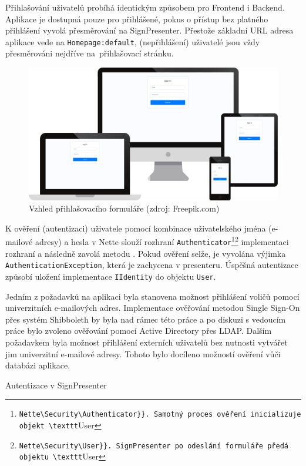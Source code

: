 Přihlašování uživatelů probíhá identickým způsobem pro Frontend i Backend. Aplikace je dostupná pouze pro přihlášené, pokus o přístup bez platného přihlášení vyvolá přesměrování na SignPresenter. Přestože základní URL adresa aplikace vede na \texttt{Homepage:default}, (nepřihlášení) uživatelé jsou vždy přesměrováni nejdříve na~přihlašovací stránku.

\begin{figure}[h]
	\centering
	\includegraphics[width=\linewidth]{svg/mockup/prihlasovani.eps}
	\captionsetup{width=\linewidth}
	\caption[Vzhled přihlašovacího formuláře]{Vzhled přihlašovacího formuláře (zdroj: Freepik.com)}
	\label{mockup:login}
\end{figure}

K ověření (autentizaci) uživatele pomocí kombinace uživatelského jména (e-mailové adresy) a hesla v Nette slouží rozhraní \texttt{Authenticator}\footnote{\Verb{Nette\Security\Authenticator}}. Samotný proces ověření inicializuje objekt \texttt{User}\footnote{\label{user}\Verb{Nette\Security\User}}. SignPresenter po odeslání formuláře předá objektu \texttt{User} implementaci rozhraní a následně zavolá metodu . Pokud ověření selže, je vyvolána výjimka \texttt{AuthenticationException}, která je zachycena v presenteru. Úspěšná autentizace způsobí uložení implementace \texttt{IIdentity} do objektu \texttt{User}.

Jedním z požadavků na aplikaci byla stanovena možnost přihlášení voličů pomocí univerzitních e-mailových adres. Implementace ověřování metodou Single Sign-On přes systém Shibboleth by byla nad rámec této práce a po diskuzi s vedoucím práce bylo zvoleno ověřování pomocí Active Directory přes LDAP. Dalším požadavkem byla možnost přihlášení externích uživatelů bez nutnosti vytvářet jim univerzitní e-mailové adresy. Tohoto bylo docíleno možností ověření vůči databázi aplikace.
\clearpage
\begin{listing}[ht]
\caption{Autentizace v SignPresenter}
\label{php:autentizace}
\end{listing}

